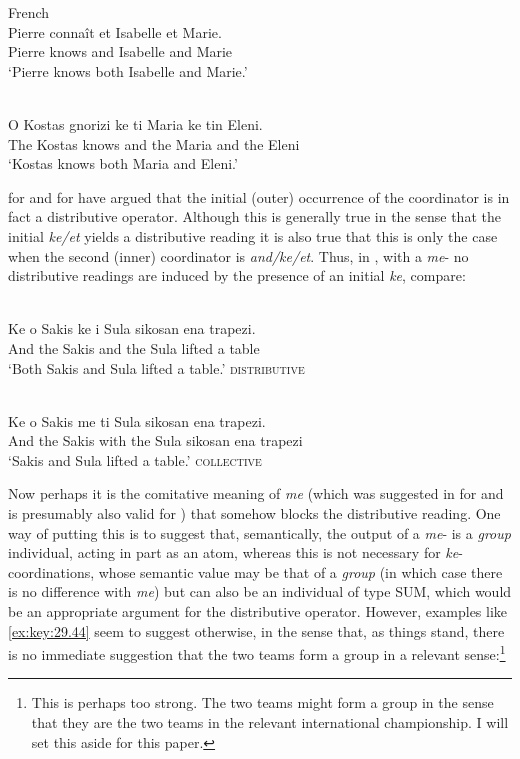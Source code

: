 \documentclass[output=paper]{langsci/langscibook}
\begin{document}
\ea\label{ex:key:29.40} French\\
    \gll    Pierre conna\^it et Isabelle et Marie.\\
            Pierre knows and Isabelle and Marie\\
    \glt    \enquote*{Pierre knows both Isabelle and Marie.}
\z

\ea\label{ex:key:29.41} \\
	\gll    O Kostas gnorizi ke ti Maria ke tin Eleni.\\
            The Kostas knows and the Maria and the Eleni\\
    \glt    \enquote*{Kostas knows both Maria and Eleni.}
\z

\citet[146, fn.\ 16]{Kayne1994} for  and \citet{cms:15} for  have
argued that the initial (outer) occurrence of the coordinator is in fact a
distributive operator. Although this is generally true in the sense that the
initial \emph{ke/et} yields a distributive reading it is also true that this is
only the case when the second (inner) coordinator is \emph{and/ke/et}. Thus,
in , with a \emph{me}- no distributive readings are induced by
the presence of an initial \emph{ke}, compare:

\ea\label{ex:key:29.42} \\
	\gll    Ke o Sakis ke i Sula sikosan ena trapezi.\\
            And the Sakis and the Sula lifted a table\\
    \glt    \enquote*{Both Sakis and Sula lifted a table.} \hfill \textsc{distributive}
\z

\ea\label{ex:key:29.43} \\
	\gll    Ke o Sakis me ti Sula sikosan ena trapezi.\\
            And the Sakis with the Sula sikosan ena trapezi\\
    \glt    \enquote*{Sakis and Sula lifted a table.} \hfill \textsc{collective}
\z

Now perhaps it is the comitative meaning of \emph{me} (which was suggested in
 for  and is presumably also valid for ) that somehow
blocks the distributive reading. One way of putting this is to suggest that,
semantically, the output of a \emph{me}- is a \emph{group}
individual, acting in part as an atom, whereas this is not necessary for
\emph{ke}-coordinations, whose semantic value may be that of a \emph{group} (in
which case there is no difference with \emph{me}) but can also be an individual
of type SUM, which would be an appropriate argument for the distributive
operator. However, examples like \eqref{ex:key:29.44} seem to suggest
otherwise, in the sense that, as things stand, there is no immediate suggestion
that the two teams form a group in a relevant sense:\footnote{This is perhaps
    too strong.  The two teams might form a group in the sense that they are
    the two  teams in the relevant international championship. I
will set this aside for this paper.}
\end{document}
